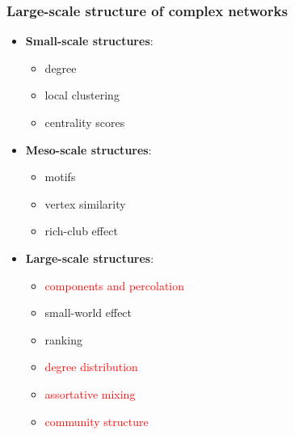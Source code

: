 \documentclass{beamer}
\begin{document}

\begin{frame}
    \frametitle{Large-scale structure of complex networks}
    \begin{itemize}
    \setlength\itemsep{1em}
        \item{{\bf Small-scale structures}: 
            \begin{itemize}
                \item{degree}
                \item{local clustering}
                \item{centrality scores}
            \end{itemize}
}
        \item{{\bf Meso-scale structures}: 
            \begin{itemize}
                \item{motifs}
                \item{vertex similarity}
                \item{rich-club effect}
            \end{itemize}
}
        \item{{\bf Large-scale structures}: 
                \begin{itemize}
                    \item{\textcolor{red}{components and percolation}}
                    \item{small-world effect}
                    \item{ranking}
                    \item{\textcolor{red}{degree distribution}}
                    \item{\textcolor{red}{assortative mixing}}
                    \item{\textcolor{red}{community structure}}
                \end{itemize}
}
    \end{itemize}
    
\end{frame}
\end{document}
